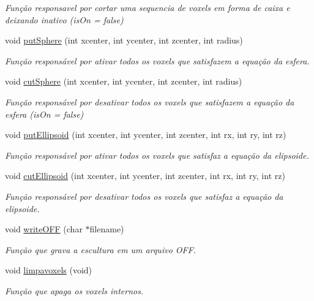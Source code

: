 \begin{DoxyCompactItemize}
\begin{DoxyCompactList}\small\item\em Função responsavel por cortar uma sequencia de voxels em forma de caixa e deixando inativo (is\+On = false) \end{DoxyCompactList}\item 
void \hyperlink{class_sculptor_a794a2b6ee8fc8098fd6150cb46101fc6}{put\+Sphere} (int xcenter, int ycenter, int zcenter, int radius)
\begin{DoxyCompactList}\small\item\em Função responsável por ativar todos os voxels que satisfazem a equação da esfera. \end{DoxyCompactList}\item 
void \hyperlink{class_sculptor_a67ab8c0ba5116adb8af1d01ad373ac15}{cut\+Sphere} (int xcenter, int ycenter, int zcenter, int radius)
\begin{DoxyCompactList}\small\item\em Função responsável por desativar todos os voxels que satisfazem a equação da esfera (is\+On = false) \end{DoxyCompactList}\item 
void \hyperlink{class_sculptor_a093615b0c2b9b3a17a56300b9b939f39}{put\+Ellipsoid} (int xcenter, int ycenter, int zcenter, int rx, int ry, int rz)
\begin{DoxyCompactList}\small\item\em Função responsável por ativar todos os voxels que satisfaz a equação da elipsoide. \end{DoxyCompactList}\item 
void \hyperlink{class_sculptor_a18d2922c111c4c13653ee07d878151ad}{cut\+Ellipsoid} (int xcenter, int ycenter, int zcenter, int rx, int ry, int rz)
\begin{DoxyCompactList}\small\item\em Função responsável por desativar todos os voxels que satisfaz a equação da elipsoide. \end{DoxyCompactList}\item 
void \hyperlink{class_sculptor_aa8ed61fc7cae10c4d7a895330fe5e309}{write\+O\+FF} (char $\ast$filename)
\begin{DoxyCompactList}\small\item\em Função que grava a escultura em um arquivo O\+FF. \end{DoxyCompactList}\item 
void \hyperlink{class_sculptor_abff902ab32553324b30ca59bc6d1f5b6}{limpavoxels} (void)
\begin{DoxyCompactList}\small\item\em Função que apaga os voxels internos. \end{DoxyCompactList}\end{DoxyCompactItemize}
